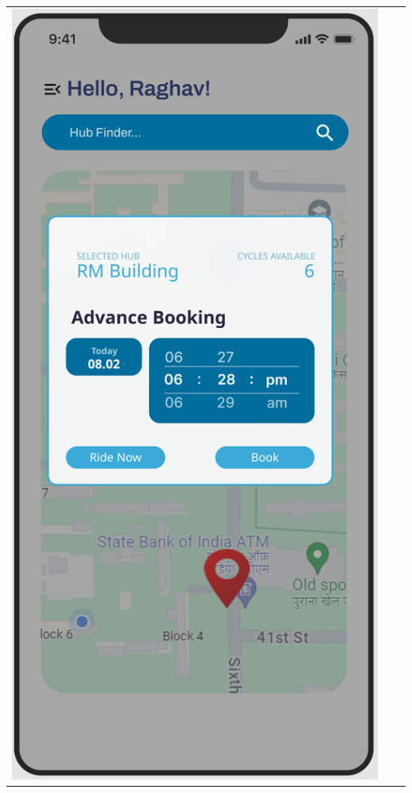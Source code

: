 \begin{center}
\begin{tabular}{ccc}
    \includegraphics[scale=0.1]{ui-images/BookRideSubscribed.png}
\end{tabular}


\end{center}
